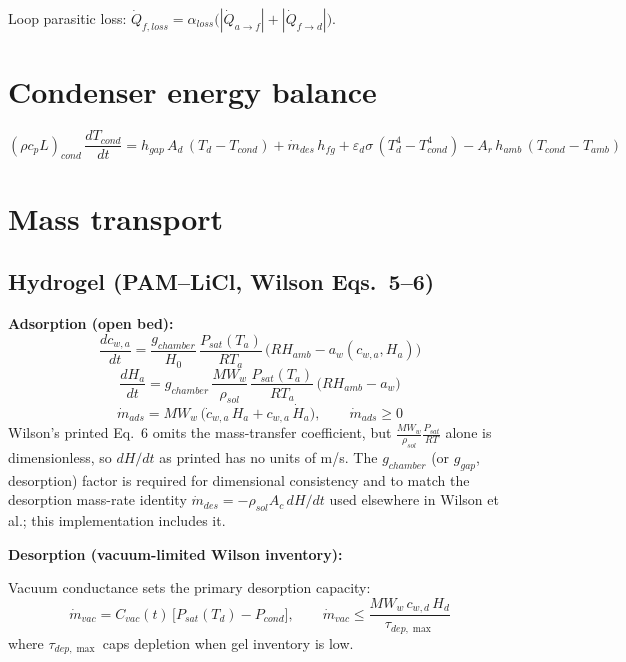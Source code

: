 \documentclass[11pt]{article}
\begin{document}
Loop parasitic loss: $\dot{Q}_{f,loss} = \alpha_{loss}\bigl(|\dot{Q}_{a\to f}| + |\dot{Q}_{f\to d}|\bigr)$.

\section{Condenser energy balance}

\begin{equation}
(\rho c_p L)_{cond}\,\frac{dT_{cond}}{dt}
= h_{gap}\,A_d\,(T_d - T_{cond})
+ \dot{m}_{des}\,h_{fg}
+ \varepsilon_d\sigma\,(T_d^4 - T_{cond}^4)
- A_r\,h_{amb}\,(T_{cond} - T_{amb})
\label{eq:condenser}
\end{equation}

\section{Mass transport}

\subsection{Hydrogel (PAM--LiCl, Wilson Eqs.~5--6)}

\textbf{Adsorption (open bed):}
\begin{equation}
\frac{dc_{w,a}}{dt} = \frac{g_{chamber}}{H_0}\,\frac{P_{sat}(T_a)}{RT_a}\,\bigl(RH_{amb} - a_w(c_{w,a}, H_a)\bigr)
\label{eq:massads}
\end{equation}
\begin{equation}
\frac{dH_a}{dt} = g_{chamber}\,\frac{MW_w}{\rho_{sol}}\,\frac{P_{sat}(T_a)}{RT_a}\,\bigl(RH_{amb} - a_w\bigr)
\end{equation}
\begin{equation}
\dot{m}_{ads} = MW_w\,\bigl(\dot{c}_{w,a}\,H_a + c_{w,a}\,\dot{H}_a\bigr), \qquad \dot{m}_{ads} \ge 0
\end{equation}
Wilson's printed Eq.~6 omits the mass-transfer coefficient, but $\frac{MW_w}{\rho_{sol}}\frac{P_{sat}}{RT}$ alone is dimensionless, so $dH/dt$ as printed has no units of m/s. The $g_{chamber}$ (or $g_{gap}$, desorption) factor is required for dimensional consistency and to match the desorption mass-rate identity $\dot{m}_{des} = -\rho_{sol}A_c\,dH/dt$ used elsewhere in Wilson et al.; this implementation includes it.

\textbf{Desorption (vacuum-limited Wilson inventory):}

Vacuum conductance sets the primary desorption capacity:
\begin{equation}
\dot{m}_{vac} = C_{vac}(t)\,\bigl[P_{sat}(T_d) - P_{cond}\bigr],
\qquad
\dot{m}_{vac} \le \frac{MW_w\,c_{w,d}\,H_d}{\tau_{dep,\max}}
\label{eq:massdes}
\end{equation}
where $\tau_{dep,\max}$ caps depletion when gel inventory is low.
\end{document}
